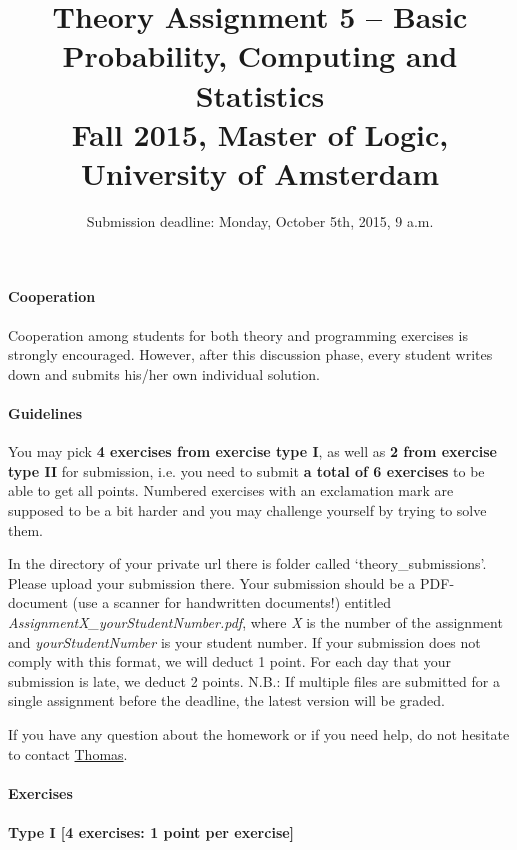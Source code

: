 \documentclass{article}
\title{Theory Assignment 5 -- Basic Probability, Computing and Statistics\\[2mm]
\large{Fall 2015, Master of Logic, University of Amsterdam}}
\author{}
\date{Submission deadline: Monday, October 5th, 2015, 9 a.m.}
\begin{document}
\maketitle

\paragraph{Cooperation}
Cooperation among students for both theory and programming exercises
is strongly encouraged.  However, after this discussion phase, every student writes down and submits his/her own individual solution.

\paragraph{Guidelines}
You may pick {\bf 4 exercises from exercise type I}, as well as {\bf 2 from exercise type II} for submission, i.e. you need to submit {\bf a total of 6 exercises} to be able to get all points. Numbered exercises with an exclamation mark are supposed to be a bit harder and you may challenge yourself by trying to solve them.

In the directory of your private url there is folder called `theory\_submissions'. Please upload your submission there. Your submission should be a PDF-document (use a scanner for handwritten documents!) entitled \textit{AssignmentX\_yourStudentNumber.pdf}, where \textit{X} is the number of the assignment and \textit{yourStudentNumber} is your student number. If your submission does not comply with this format, we will deduct 1 point. For each day that your submission is late, we deduct 2 points. N.B.: If multiple files are submitted for a single assignment before the deadline, the latest version will be graded.

If you have any question about the homework or if you need help, do not hesitate to contact \href{mailto:T.S.Brochhagen@uva.nl}{Thomas}.

\paragraph{Exercises}

\paragraph{Type I [4 exercises: 1 point per exercise]}
\end{document}
